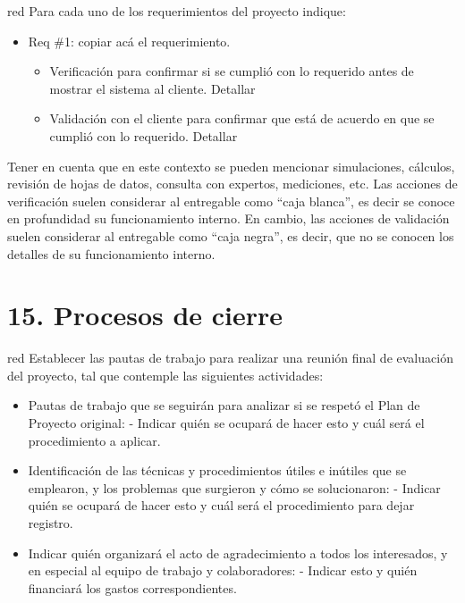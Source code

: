 \documentclass[
11pt, %
]{charter}
\begin{document}
\begin{consigna}{red}
Para cada uno de los requerimientos del proyecto indique:
\begin{itemize} 
\item Req \#1: copiar acá el requerimiento.

\begin{itemize}
	\item Verificación para confirmar si se cumplió con lo requerido antes de mostrar el sistema al cliente. Detallar 
	\item Validación con el cliente para confirmar que está de acuerdo en que se cumplió con lo requerido. Detallar  
\end{itemize}

\end{itemize}

Tener en cuenta que en este contexto se pueden mencionar simulaciones, cálculos, revisión de hojas de datos, consulta con expertos, mediciones, etc.  Las acciones de verificación suelen considerar al entregable como ``caja blanca'', es decir se conoce en profundidad su funcionamiento interno.  En cambio, las acciones de validación suelen considerar al entregable como ``caja negra'', es decir, que no se conocen los detalles de su funcionamiento interno.

\end{consigna}

\section{15. Procesos de cierre}    
\label{sec:cierre}

\begin{consigna}{red}
Establecer las pautas de trabajo para realizar una reunión final de evaluación del proyecto, tal que contemple las siguientes actividades:

\begin{itemize}
	\item Pautas de trabajo que se seguirán para analizar si se respetó el Plan de Proyecto original:
	 - Indicar quién se ocupará de hacer esto y cuál será el procedimiento a aplicar. 
	\item Identificación de las técnicas y procedimientos útiles e inútiles que se emplearon, y los problemas que surgieron y cómo se solucionaron:
	 - Indicar quién se ocupará de hacer esto y cuál será el procedimiento para dejar registro.
	\item Indicar quién organizará el acto de agradecimiento a todos los interesados, y en especial al equipo de trabajo y colaboradores:
	  - Indicar esto y quién financiará los gastos correspondientes.
\end{itemize}

\end{consigna}
\end{document}
